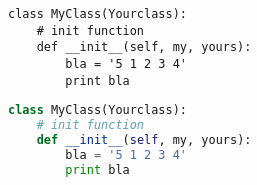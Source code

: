 \documentclass[12pt]{article}
\begin{document}
\begin{lstlisting}[style={python-style},caption={python style}]
class MyClass(Yourclass):
    # init function
    def __init__(self, my, yours):
        bla = '5 1 2 3 4'
        print bla
\end{lstlisting}

\begin{lstlisting}[language=Python,caption={default Settings}]
class MyClass(Yourclass):
    # init function
    def __init__(self, my, yours):
        bla = '5 1 2 3 4'
        print bla
\end{lstlisting}
\clearpage
\blinddocument
\makeendpage
\end{document}
